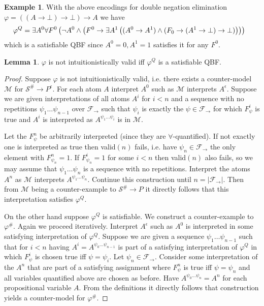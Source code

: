 \documentclass[a4paper,12pt]{report}
\theoremstyle{definition}
\theoremstyle{definition}
\theoremstyle{definition}
\newtheorem{lemma}[theorem]{Lemma}
\theoremstyle{definition}
\theoremstyle{definition}
\theoremstyle{definition}
\newtheorem{example}[theorem]{Example}
\theoremstyle{definition}
\begin{document}
	\begin{example}
		With the above encodings for double negation elimination $\varphi = ((A\to \bot)\to \bot)\to A$ we have
		$$\hspace*{-.3cm}
			\varphi^Q = \exists A^0\forall F^0\left(\neg A^0\wedge\left(F^0\to \exists A^1\left((A^0\to A^1)\wedge(F_0\to (A^1\to \bot)\to \bot)\right)\right)\right)
		$$
		which is a satisfiable QBF since $A^0 = 0, A^1 = 1$ satisfies it for any $F^0$.
	\end{example}


	\begin{lemma}
		$\varphi$ is not intuitionistically valid iff $\varphi^Q$ is a satisfiable QBF.
	\end{lemma}
	\begin{proof}
		Suppose $\varphi$ is not intuitionistically valid, i.e. there exists a counter-model $\mathcal M$ for $\mathcal S^\#\to P^\epsilon$. For each atom $A$ interpret $A^0$ such as $\mathcal M$ interprets $A^\epsilon$. Suppose we are given interpretations of all atoms $A^i$ for $i < n$ and a sequence with no repetitions $\psi_1\dots\psi_{n-1}$ over $\mathcal F_\to$ such that $\psi_i$ is exactly the $\psi\in\mathcal F_\to$ for which $F_{\psi}^i$ is true and $A^i$ is interpreted as $A^{\psi_1\dots\psi_i}$ is in $\mathcal M$.
		
		Let the $F^{n}_\psi$ be arbitrarily interpreted (since they are $\forall$-quantified). If not exactly one is interpreted as true then valid$(n)$ fails, i.e. have $\psi_n\in\mathcal F_\to$ the only element with $F^n_{\psi_n} = 1$. If $F^i_{\psi_n} = 1$ for some $i < n$ then valid$(n)$ also fails, so we may assume that $\psi_1\dots\psi_n$ is a sequence with no repetitions. Interpret the atoms $A^n$ as $\mathcal M$ interprets $A^{\psi_1\dots\psi_n}$. Continue this construction until $n  = |\mathcal F_\to|$. Then from $\mathcal M$ being a counter-example to $\mathcal S^\#\to P$ it directly follows that this interpretation satisfies $\varphi^Q$.
		
		On the other hand suppose $\varphi^Q$ is satisfiable. We construct a counter-example to $\varphi^\#$.
		Again we proceed iteratively. Interpret $A^\epsilon$ such as $A^0$ is interpreted in some satisfying interpretation of $\varphi^Q$. Suppose we are given a sequence $\psi_1\dots \psi_{n-1}$ such that for $i<n$ having $A^i = A^{\psi_0\dots\psi_{n-1}}$ is part of a satisfying interpretation of $\varphi^Q$ in which $F^i_\psi$ is chosen true iff $\psi = \psi_i$. Let $\psi_n\in\mathcal F_\to$. Consider some interpretation of the $A^n$ that are part of a satisfying assignment where $F^n_\psi$ is true iff $\psi = \psi_n$ and all variables quantified above are chosen as before. Have $A^{\psi_0\dots\psi_n} = A^n$ for each propositional variable $A$. From the definitions it directly follows that construction yields a counter-model for $\varphi^\#$.
	\end{proof}
\end{document}
